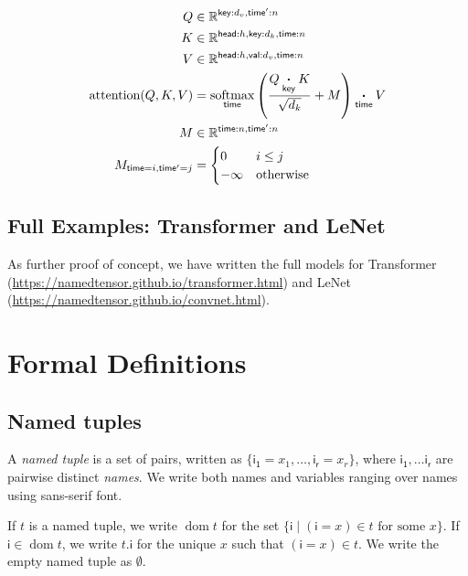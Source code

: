 \documentclass{article}
\newcommand{\name}[1]{\mathsf{#1}}
\newcommand{\nidx}[2]{\name{#1}=#2}
\newcommand{\nset}[2]{\name{#1}:#2}
\newcommand{\ndot}[1]{\mathbin{\mathop{\thinspace\boldsymbol\cdot\thinspace}\limits_{\name{#1}}}}
\newcommand{\nfun}[2]{\mathop{\text{#2}}\limits_{\name{#1}}}
\newcommand{\tuple}[1]{\{ #1\}}
\DeclareMathOperator{\tupledom}{dom}
\newcommand{\tupleproj}[2]{#1.\name{#2}}
\newcommand{\reals}{\mathbb{R}}
\begin{document}
\begin{align*} 
Q &\in \reals^{\nset{key}{d_v},\nset{time'}{n}}\\
K &\in \reals^{\nset{head}{h},\nset{key}{d_k}, \nset{time}{n}}\\
V &\in \reals^{\nset{head}{h}, \nset{val}{d_v}, \nset{time}{n}}\\
\text{attention}(Q, K, V) &=  \nfun{time}{softmax} \left( \frac{Q \ndot{key} K}{\sqrt{d_k}} + M \right) \ndot{time} V \\
M & \in \reals^{\nset{time}{n}, \nset{time'}{n}} \\
M_{\nidx{time}{i}, \nidx{time'}{j}} & = \begin{cases}0 & i \leq j\\
-\infty & \text{otherwise} \end{cases} \\
\end{align*}


\subsection{Full Examples: Transformer and LeNet}

As further proof of concept, we have written the full models for Transformer (\url{https://namedtensor.github.io/transformer.html}) and LeNet (\url{https://namedtensor.github.io/convnet.html}). 

\section{Formal Definitions}
\label{sec:definitions}

\newcommand{\sub}[1]{_\text{$#1$}}

\subsection{Named tuples}

A \emph{named tuple} is a set of pairs, written as $\tuple{\nidx{i\sub{1}}{x_1}, \ldots, \nidx{i\sub{r}}{x_r}}$, where $\name{i\sub{1}}, \ldots \name{i\sub{r}}$ are pairwise distinct \emph{names}. We write both names and variables ranging over names using sans-serif font.

If $t$ is a named tuple, we write $\tupledom{t}$ for the set $\{\name{i} \mid \text{$(\nidx{i}{x}) \in t$ for some $x$} \}$. If $\name{i} \in \tupledom{t}$, we write $\tupleproj{t}{i}$ for the unique $x$ such that $(\nidx{i}{x}) \in t$. We write the empty named tuple as $\emptyset$.
\end{document}
